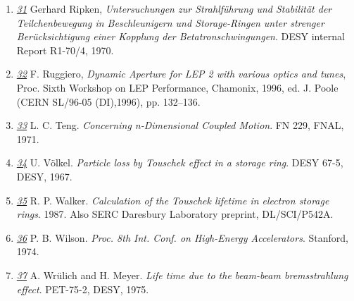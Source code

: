 \begin{enumerate}
   \item \href{ripken}{\textit{31}} Gerhard Ripken,
     \textit{Untersuchungen zur Strahlf\"uhrung und Stabilit\"at der
       Teilchenbewegung in Beschleunigern und Storage-Ringen unter
       strenger Ber\"ucksichtigung einer Kopplung der
       Betatronschwingungen}. DESY internal Report R1-70/4, 1970.  


   \item \href{chamonix96}{\textit{32}} F. Ruggiero, \textit{Dynamic
     Aperture for LEP 2 with various optics and tunes}, Proc. Sixth
     Workshop on LEP Performance, Chamonix, 1996, ed. J. Poole (CERN
     SL/96-05 (DI),1996), pp. 132--136.  


   \item \href{teng}{\textit{33}} L. C. Teng. \textit{Concerning
     n-Dimensional Coupled Motion}. FN 229, FNAL, 1971.  


   \item \href{voelkel}{\textit{34}} U. V\"olkel. \textit{Particle loss
     by Touschek effect in a storage ring}. DESY 67-5, DESY, 1967.  


   \item \href{walker}{\textit{35}} R. P. Walker. \textit{Calculation of
     the Touschek lifetime in electron storage rings}. 1987. Also SERC
     Daresbury Laboratory preprint, DL/SCI/P542A.  


   \item \href{wilson}{\textit{36}} P. B. Wilson. \textit{Proc. 8th
     Int. Conf. on High-Energy Accelerators}. Stanford, 1974.  


   \item \href{wrulich}{\textit{37}} A. Wr\"ulich and
     H. Meyer. \textit{Life time due to the beam-beam bremsstrahlung
       effect}. PET-75-2, DESY, 1975. 

\end{enumerate}


